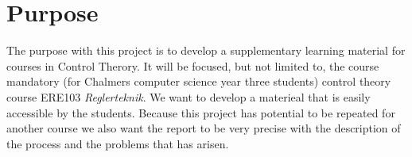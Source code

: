 \section{Purpose}
The purpose with this project is to develop a supplementary learning material for courses in Control Therory. It will be focused, but not limited to, the course mandatory (for Chalmers computer science year three students) control theory course ERE103 \textit{Reglerteknik}. We want to develop a materieal that is easily accessible by the students. Because this project has potential to be repeated for another course we also want the report to be very precise with the description of the process and the problems that has arisen.

\iffalse
Syfte
Specificerar vad rapporten är tänkt att resultera i och vilken typ av resultat som kommer att uppnås. 
Lämpligt att ha ett generellt syfte, kanske några få specificerade delsyften. 
I problemanalysen bryts syftet ner i mer detaljerade delsyften.
\fi
